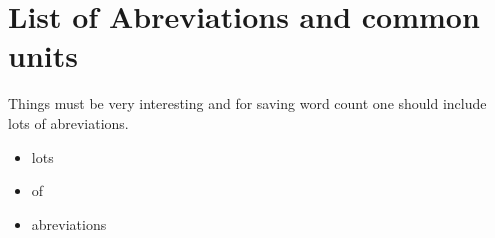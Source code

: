 \chapter*{List of Abreviations and common units}


Things must be very interesting and for saving word count one should include lots of abreviations.

\begin{itemize}
    \item lots
    \item of 
    \item abreviations
\end{itemize}
